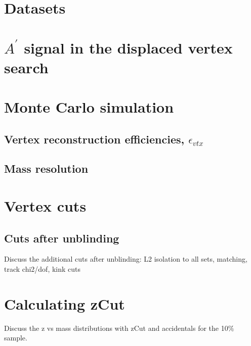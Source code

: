 \documentclass[12pt]{report}
\begin{document}
\section{Datasets}


\section{$A^{\prime}$ signal in the displaced vertex search}


\section{Monte Carlo simulation}


\subsection{Vertex reconstruction efficiencies, $\epsilon_{vtx}$}


\subsection{Mass resolution}



\section{Vertex cuts}

\subsection{Cuts after unblinding}
Discuss the additional cuts after unblinding: L2 isolation to all sets, matching, track chi2/dof, kink cuts
%
%

\section{Calculating zCut}
Discuss the z vs mass distributions with zCut and accidentals for the 10$\%$ sample.
\end{document}
